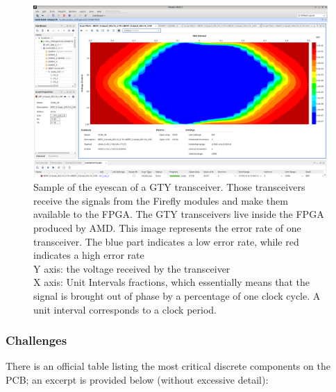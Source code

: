 \begin{figure}[H]
\centering
\includegraphics[width=\textwidth]{images/contributions/eyescan.png}
\caption[Sample of the eyescan of a GTY transceiver]{Sample of the eyescan of a GTY transceiver. Those transceivers receive the signals from the Firefly \protect\cite{firefly-optical-transceiver} modules and make them available to the FPGA. The GTY transceivers live inside the FPGA produced by AMD. This image represents the error rate of one transceiver. The blue part indicates a low error rate, while red indicates a high error rate\\
Y axis: the voltage received by the transceiver\\
X axis: Unit Intervals fractions, which essentially means that the signal is brought out of phase by a percentage of one clock cycle. A unit interval corresponds to a clock period.}
\label{fig:eyescan-test}
\end{figure}

\clearpage
\subsubsection{Challenges}

There is an official table listing the most critical discrete components on the \ac{PCB}; an excerpt is provided below (without excessive detail):

